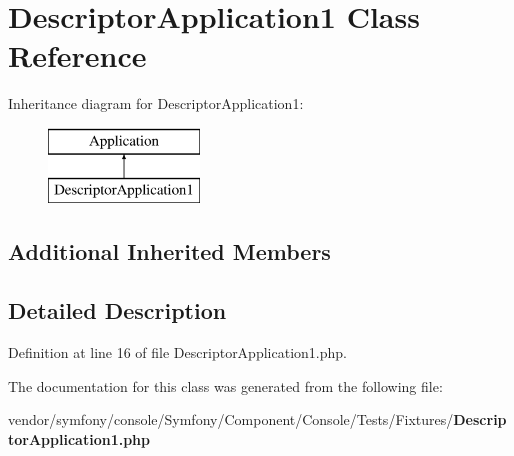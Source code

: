 \section{Descriptor\+Application1 Class Reference}
\label{class_symfony_1_1_component_1_1_console_1_1_tests_1_1_fixtures_1_1_descriptor_application1}
Inheritance diagram for Descriptor\+Application1\+:\begin{figure}[H]
\begin{center}
\leavevmode
\includegraphics[height=2.000000cm]{class_symfony_1_1_component_1_1_console_1_1_tests_1_1_fixtures_1_1_descriptor_application1}
\end{center}
\end{figure}
\subsection*{Additional Inherited Members}


\subsection{Detailed Description}


Definition at line 16 of file Descriptor\+Application1.\+php.



The documentation for this class was generated from the following file\+:\begin{DoxyCompactItemize}
\item 
vendor/symfony/console/\+Symfony/\+Component/\+Console/\+Tests/\+Fixtures/{\bf Descriptor\+Application1.\+php}\end{DoxyCompactItemize}
